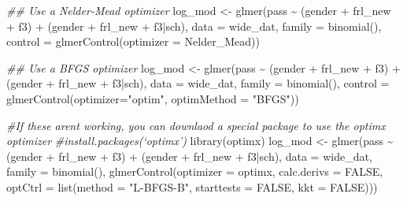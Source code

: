 \documentclass[
  letterpaper,
  DIV=11,
  numbers=noendperiod]{scrreprt}
\newenvironment{Shaded}{}{}
\newcommand{\AttributeTok}[1]{\textcolor[rgb]{0.49,0.56,0.16}{#1}}
\newcommand{\CommentTok}[1]{\textcolor[rgb]{0.38,0.63,0.69}{\textit{#1}}}
\newcommand{\ConstantTok}[1]{\textcolor[rgb]{0.53,0.00,0.00}{#1}}
\newcommand{\DocumentationTok}[1]{\textcolor[rgb]{0.73,0.13,0.13}{\textit{#1}}}
\newcommand{\FunctionTok}[1]{\textcolor[rgb]{0.02,0.16,0.49}{#1}}
\newcommand{\NormalTok}[1]{#1}
\newcommand{\OtherTok}[1]{\textcolor[rgb]{0.00,0.44,0.13}{#1}}
\newcommand{\SpecialCharTok}[1]{\textcolor[rgb]{0.25,0.44,0.63}{#1}}
\newcommand{\StringTok}[1]{\textcolor[rgb]{0.25,0.44,0.63}{#1}}
\begin{document}
\begin{Shaded}
\begin{Highlighting}[]
\DocumentationTok{\#\# Use a Nelder{-}Mead optimizer}
\NormalTok{log\_mod }\OtherTok{\textless{}{-}} \FunctionTok{glmer}\NormalTok{(pass }\SpecialCharTok{\textasciitilde{}}\NormalTok{ (gender }\SpecialCharTok{+}\NormalTok{ frl\_new }\SpecialCharTok{+}\NormalTok{ f3) }\SpecialCharTok{+} 
\NormalTok{                   (gender }\SpecialCharTok{+}\NormalTok{ frl\_new }\SpecialCharTok{+}\NormalTok{ f3}\SpecialCharTok{|}\NormalTok{sch), }
                 \AttributeTok{data =}\NormalTok{ wide\_dat, }\AttributeTok{family =} \FunctionTok{binomial}\NormalTok{(),}
                 \AttributeTok{control =} \FunctionTok{glmerControl}\NormalTok{(}\AttributeTok{optimizer =} \StringTok{\textquotesingle{}Nelder\_Mead\textquotesingle{}}\NormalTok{))}

\DocumentationTok{\#\# Use a BFGS optimizer }
\NormalTok{log\_mod }\OtherTok{\textless{}{-}} \FunctionTok{glmer}\NormalTok{(pass }\SpecialCharTok{\textasciitilde{}}\NormalTok{ (gender }\SpecialCharTok{+}\NormalTok{ frl\_new }\SpecialCharTok{+}\NormalTok{ f3) }\SpecialCharTok{+} 
\NormalTok{                   (gender }\SpecialCharTok{+}\NormalTok{ frl\_new }\SpecialCharTok{+}\NormalTok{ f3}\SpecialCharTok{|}\NormalTok{sch), }
                 \AttributeTok{data =}\NormalTok{ wide\_dat, }\AttributeTok{family =} \FunctionTok{binomial}\NormalTok{(),}
                 \AttributeTok{control =} \FunctionTok{glmerControl}\NormalTok{(}\AttributeTok{optimizer=}\StringTok{"optim"}\NormalTok{, }\AttributeTok{optimMethod =} \StringTok{"BFGS"}\NormalTok{))}

\CommentTok{\#If these aren\textquotesingle{}t working, you can downlaod a special package to use the optimx optimizer}
\CommentTok{\#install.packages(‘optimx’)}
\FunctionTok{library}\NormalTok{(optimx)}
\NormalTok{log\_mod }\OtherTok{\textless{}{-}} \FunctionTok{glmer}\NormalTok{(pass }\SpecialCharTok{\textasciitilde{}}\NormalTok{ (gender }\SpecialCharTok{+}\NormalTok{ frl\_new }\SpecialCharTok{+}\NormalTok{ f3) }\SpecialCharTok{+} 
\NormalTok{                   (gender }\SpecialCharTok{+}\NormalTok{ frl\_new }\SpecialCharTok{+}\NormalTok{ f3}\SpecialCharTok{|}\NormalTok{sch), }
                 \AttributeTok{data =}\NormalTok{ wide\_dat, }\AttributeTok{family =} \FunctionTok{binomial}\NormalTok{(),}
                 \FunctionTok{glmerControl}\NormalTok{(}\AttributeTok{optimizer =} \StringTok{\textquotesingle{}optimx\textquotesingle{}}\NormalTok{, }\AttributeTok{calc.derivs =} \ConstantTok{FALSE}\NormalTok{,}
                              \AttributeTok{optCtrl =} \FunctionTok{list}\NormalTok{(}\AttributeTok{method =} \StringTok{"L{-}BFGS{-}B"}\NormalTok{, }
                                             \AttributeTok{starttests =} \ConstantTok{FALSE}\NormalTok{, }
                                             \AttributeTok{kkt =} \ConstantTok{FALSE}\NormalTok{)))}
\end{Highlighting}
\end{Shaded}
\end{document}

